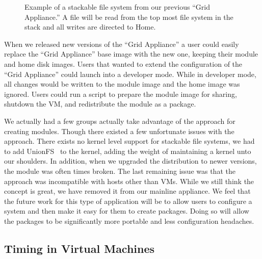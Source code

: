 \documentclass[conference]{IEEEtran}
\begin{document}
\begin{figure}[ht]
\centering
{}
\caption{Example of a stackable file system from our previous ``Grid
Appliance.''  A file will be read from the top most file system in the stack
and all writes are directed to Home.}
\label{fig:stackfs}
\end{figure}

When we released new versions of the ``Grid Appliance'' a user could easily
replace the ``Grid Appliance'' base image with the new one, keeping their
module and home disk images.  Users that wanted to extend the configuration of
the ``Grid Appliance'' could launch into a developer mode.  While in developer
mode, all changes would be written to the module image and the home image was
ignored.  Users could run a script to prepare the module image for sharing,
shutdown the VM, and redistribute the module as a package.

We actually had a few groups actually take advantage of the approach for
creating modules.  Though there existed a few unfortunate issues with the
approach.  There exists no kernel level support for stackable file systems, we
had to add UnionFS~\cite{unionfs} to the kernel, adding the weight of
maintaining a kernel unto our shoulders.  In addition, when we upgraded the
distribution to newer versions, the module was often times broken.  The last
remaining issue was that the approach was incompatible with hosts other than
VMs.  While we still think the concept is great, we have removed it from our
mainline appliance.  We feel that the future work for this type of application
will be to allow users to configure a system and then make it easy for them to
create packages.  Doing so will allow the packages to be significantly more
portable and less configuration headaches.

\subsection{Timing in Virtual Machines}
\end{document}
